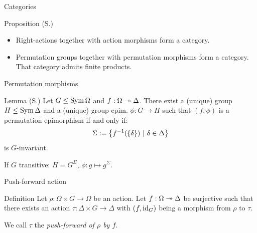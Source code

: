 \documentclass{beamer}
\theoremstyle{plain}
\theoremstyle{definition}
\begin{document}
\begin{frame}{Categories}
\begin{block}{Proposition (S.)}
\begin{itemize}
\item Right-actions together with action morphisms form a category.
\item
Permutation groups together with permutation morphisms form a category.
That category admits finite products.
\end{itemize}
\end{block}
\end{frame}


\begin{frame}{Permutation morphisms}
\begin{block}{Lemma (S.)}
Let $G \leq \operatorname{Sym} \Omega$ and $f : \Omega \twoheadrightarrow \Delta$.
There exist a (unique) group $H \leq \operatorname{Sym} \Delta$ and a (unique)
group epim. $\phi : G \to H$ such that
$(f, \phi)$ is a permutation epimorphism
if and only if:
\[
    \Sigma :=  \left\{  f ^ {-1}( \left\{ \delta \right\} ) ~|~ \delta \in \Delta  \right\} 
\]
is $G$-invariant.
\end{block}


\pause
If $G$ transitive: $H = G ^ \Sigma$, $\phi : g \mapsto g ^ \Sigma$.
\end{frame}


%

\begin{frame}{Push-forward action}
\begin{block}{Definition}
Let $\rho : \Omega \times G \to \Omega$ be an action.
Let $f : \Omega \twoheadrightarrow \Delta$ be surjective such that there exists
an action $\tau : \Delta \times G \to \Delta$ with
$(f, \operatorname{id}_G)$ being a morphism from $\rho$ to $\tau$.

We call $\tau$ the \emph{push-forward of $\rho$ by $f$}.
\end{block}
\end{frame}
\end{document}
